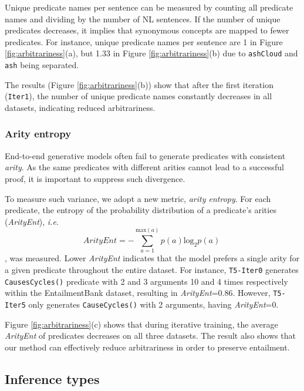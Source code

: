 Unique predicate names per sentence can be measured by counting all predicate names and dividing by the number of NL sentences. If the number of unique predicates decreases, it implies that synonymous concepts are mapped to fewer predicates. For instance, unique predicate names per sentence are 1 in Figure \ref{fig:arbitrariness}(a), but 1.33 in Figure \ref{fig:arbitrariness}(b) due to \texttt{ashCloud} and \texttt{ash} being separated.


The results (Figure \ref{fig:arbitrariness}(b)) show that after the first iteration (\texttt{Iter1}), the number of unique predicate names constantly decreases in all datasets, indicating reduced arbitrariness.


\subsubsection{Arity entropy}
End-to-end generative models often fail to generate predicates with consistent \textit{arity}. As the same predicates with different arities cannot lead to a successful proof, it is important to suppress such divergence.

To measure such variance, we adopt a new metric, \textit{arity entropy}. For each predicate, the entropy of the probability distribution of a predicate's arities (\textit{ArityEnt}), \textit{i.e.}
\[
\textit{ArityEnt} = -\sum_{a=1}^{\textrm{max}(a)} p(a)\textrm{log}_2 p(a) \
\]
, was measured. Lower \textit{ArityEnt} indicates that the model prefers a single arity for a given predicate throughout the entire dataset. For instance, \texttt{T5-Iter0} generates \texttt{CausesCycles()} predicate with 2 and 3 arguments 10 and 4 times respectively within the EntailmentBank dataset, resulting in \textit{ArityEnt}=0.86. However, \texttt{T5-Iter5} only generates \texttt{CauseCycles()} with 2 arguments, having \textit{ArityEnt}=0.

Figure \ref{fig:arbitrariness}(c) shows that during iterative training, the average \textit{ArityEnt} of predicates decreases on all three datasets. The result also shows that our method can effectively reduce arbitrariness in order to preserve entailment.

\subsection{Inference types}

